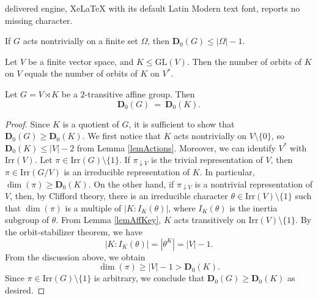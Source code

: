 \documentclass[10pt,a4paper]{amsart}
\newcommand{\D}{\mathbf{D}}
\newcommand{\GL}{\mathrm{GL}}
\newcommand{\Irr}{\mathrm{Irr}}
\begin{document}
delivered engine, XeLaTeX with its default Latin Modern text font, reports no missing character.
\begin{lemma} \label{lemActions}
If $G$ acts nontrivially on a finite set $\Omega$, then $\D_0(G) \leq |\Omega|-1$.
\end{lemma}

\begin{lemma} \label{lemAffKey} 
	Let $V$ be a finite vector space, and $K \leqslant \GL(V)$.
	Then the number of orbits of $K$ on $V$ equals the number of orbits of $K$ on $V^*$.
\end{lemma}

\begin{lemma} \label{lemAffSp} 
	Let $G = V \rtimes K$ be a $2$-transitive affine group.
	Then
	$$ \D_0(G) \> = \> \D_0(K) . $$
\end{lemma}

\begin{proof}
	Since $K$ is a quotient of $G$,
	it is sufficient to show that $\D_0(G) \geq \D_0(K)$.
	We first notice that $K$ acts nontrivially on $V \setminus \{0\}$,
	so $\D_0(K) \leq |V|-2$ from Lemma \ref{lemActions}.
	Moreover, we can identify $V^*$ with $\Irr(V)$.
	Let $\pi \in \Irr(G) \setminus \{1\}$.
	If $\pi_{\downarrow V}$ is the trivial representation of $V$, then $\pi \in \Irr(G/V)$ is an irreducible representation of $K$.
	In particular, $\dim(\pi) \geq \D_0(K)$.
	On the other hand, if $\pi_{\downarrow V}$ is a nontrivial representation of $V$,
	then, by Clifford theory, there is an irreducible character $\theta \in \Irr(V) \setminus \{1\}$ such that
	$\dim(\pi)$ is a multiple of $|K:I_K(\theta)|$, where $I_K(\theta)$ is the inertia subgroup of $\theta$. 
	From Lemma \ref{lemAffKey}, $K$ acts transitively on $\Irr(V) \setminus \{1\}$.
	By the orbit-stabilizer theorem, we have
	$$ |K:I_K(\theta)| = |\theta^K| = |V|-1 . $$
	From the discussion above, we obtain
	$$ \dim(\pi) \geq |V|-1 > \D_0(K) . $$
	Since $\pi \in \Irr(G) \setminus \{1\}$ is arbitrary, we conclude that $\D_0(G) \geq \D_0(K)$ as desired.
\end{proof}
\end{document}
